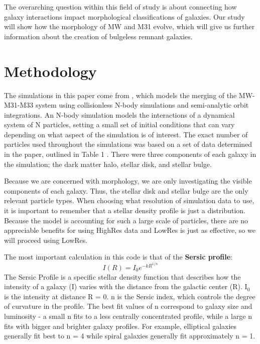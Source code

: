 \documentclass[linenumbers,trackchanges,twocolumn]{aastex7}
\begin{document}
The overarching question within this field of study is about connecting how galaxy interactions impact morphological classifications of galaxies. Our study will show how the morphology of MW and M31 evolve, which will give us further information about the creation of bulgeless remnant galaxies. 


\section{Methodology}

The simulations in this paper come from \cite{van_der_Marel_2012}, which models the merging of the MW-M31-M33 system using collisionless N-body simulations and semi-analytic orbit integrations. An N-body simulation models the interactions of a dynamical system of N particles, setting a small set of initial conditions that can vary depending on what aspect of the simulation is of interest. The exact number of particles used throughout the simulations was based on a set of data determined in the paper, outlined in Table 1 \citep{van_der_Marel_2012}. There were three components of each galaxy in the simulation; the dark matter halo, stellar disk, and stellar bulge. 

Because we are concerned with morphology, we are only investigating the visible components of each galaxy. Thus, the stellar disk and stellar bulge are the only relevant particle types. When choosing what resolution of simulation data to use, it is important to remember that a stellar density profile is just a distribution. Because the model is accounting for such a large scale of particles, there are no appreciable benefits for using HighRes data and LowRes is just as effective, so we will proceed using LowRes. 

The most important calculation in this code is that of the \textbf{Sersic profile}:
\begin{equation} \label{eq:1}
    I(R) = I_0e^{-kR^{1/n}}
\end{equation}
The Sersic Profile is a specific stellar density function that describes how the intensity of a galaxy (I) varies with the distance from the galactic center (R). I$_0$ is the intensity at distance R = 0. n is the Sersic index, which controls the degree of curvature in the profile. The best fit values of n correspond to galaxy size and luminosity - a small n fits to a less centrally concentrated profile, while a large n fits with bigger and brighter galaxy profiles. For example, elliptical galaxies generally fit best to n = 4 while spiral galaxies generally fit approximately n = 1. 
\end{document}
